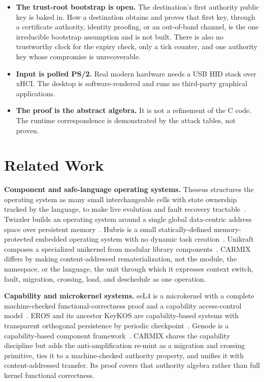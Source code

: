 \documentclass[10pt,twocolumn]{article}
\newcommand{\carmix}{CARMIX}
\begin{document}
\begin{itemize}
\item \textbf{The trust-root bootstrap is open.} The destination's first authority
public key is baked in. How a destination obtains and proves that first key,
through a certificate authority, identity proofing, or an out-of-band channel, is
the one irreducible bootstrap assumption and is not built. There is also no
trustworthy clock for the expiry check, only a tick counter, and one authority key
whose compromise is unrecoverable.
\item \textbf{Input is polled PS/2.} Real modern hardware needs a USB HID stack
over xHCI. The desktop is software-rendered and runs no third-party graphical
applications.
\item \textbf{The proof is the abstract algebra.} It is not a refinement of the C
code. The runtime correspondence is demonstrated by the attack tables, not proven.
\end{itemize}

\section{Related Work}

\textbf{Component and safe-language operating systems.} Theseus structures the
operating system as many small interchangeable cells with state ownership tracked
by the language, to make live evolution and fault recovery
tractable~\cite{boos2020theseus}. Twizzler builds an operating system around a
single global data-centric address space over persistent
memory~\cite{bittman2020twizzler}. Hubris is a small statically-defined
memory-protected embedded operating system with no dynamic task
creation~\cite{oxide2021hubris}. Unikraft composes a specialized unikernel from
modular library components~\cite{kuenzer2021unikraft}. \carmix{} differs by making
content-addressed rematerialization, not the module, the namespace, or the
language, the unit through which it expresses context switch, fault, migration,
crossing, load, and deschedule as one operation.

\textbf{Capability and microkernel systems.} seL4 is a microkernel with a complete
machine-checked functional-correctness proof and a capability access-control
model~\cite{klein2009sel4}. EROS and its ancestor KeyKOS are
capability-based systems with transparent orthogonal persistence by periodic
checkpoint~\cite{shapiro1999eros,hardy1985keykos}. Genode is a capability-based
component framework~\cite{feske2015genode}. \carmix{} shares the capability
discipline but adds the anti-amplification re-mint as a migration and crossing
primitive, ties it to a machine-checked authority property, and unifies it with
content-addressed transfer. Its proof covers that authority algebra rather than
full kernel functional correctness.
\end{document}
